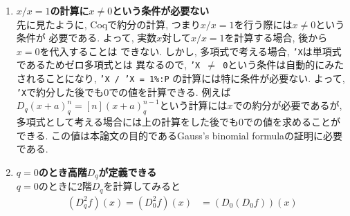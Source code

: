 \documentclass[11pt]{jarticle}
\theoremstyle{mystyle}
\newcommand{\0}{\textbf{0}}
\newcommand{\1}{\textbf{1}}
\newcommand{\2}{\textbf{2}}
\begin{document}
\begin{enumerate}
\item \textbf{$x / x = 1$の計算に$x \neq 0$という条件が必要ない}\\
  先に見たように, Coqで約分の計算, つまり$x / x = 1$を行う際には$x \ne 0$という条件が
  必要である. よって, 実数$x$対して$x / x = 1$を計算する場合, 後から$x = 0$を代入することは
  できない.   しかし, 多項式で考える場合, {\tt 'X}は単項式であるためゼロ多項式とは
  異なるので, {\tt 'X $\neq$ 0}という条件は自動的にみたされることになり, {\tt 'X / 'X = 1\%:P}
  の計算には特に条件が必要ない. よって, {\tt 'X}で約分した後でも$0$での値を計算できる.  
  例えば$D_q (x + a)^n_q = [n](x + a)^{n - 1}_q$という計算には$x$での約分が必要であるが, 
  多項式として考える場合には上の計算をした後でも$0$での値を求めることができる. 
  この値は本論文の目的であるGauss's binomial formulaの証明に必要である. 
%
%
\item \textbf{$q = 0$のとき高階$D_q$が定義できる}\\
	$q = 0$のときに2階$D_q$を計算してみると
	\begin{align*}
	  (D_q ^2 f) (x) = (D_0 ^2 f) (x) &= (D_0 (D_0 f)) (x) \\

\end{align*}
\end{enumerate}
\end{document}
